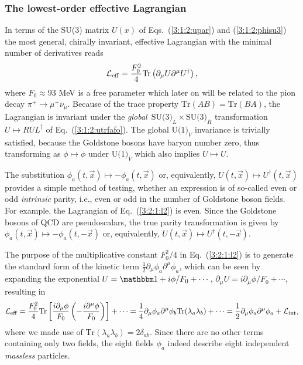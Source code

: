 \documentclass[twoside,12pt]{article}
\begin{document}
\subsubsection{The lowest-order effective Lagrangian}
\label{sec_loel}
   In terms of the SU(3) matrix $U(x)$ of Eqs.~(\ref{3:1:2:upar}) and
(\ref{3:1:2:phisu3}) the most general, chirally invariant, effective Lagrangian
with the minimal number of derivatives reads
\begin{equation}
\label{3:2:1:l2}
{\cal L}_{\rm eff}
=\frac{F^2_0}{4}\mbox{Tr}\left(\partial_\mu U \partial^\mu U^\dagger
\right),
\end{equation}
   where $F_0\approx 93$ MeV is a free parameter which later on will be
related to the pion decay $\pi^+\to\mu^+\nu_\mu$.
   Because of the trace property $\mbox{Tr}(AB)=\mbox{Tr}(BA)$,
the Lagrangian is invariant under the {\em global}\,
$\mbox{SU(3)}_L\times\mbox{SU(3)}_R$ transformation $U \mapsto R U L^\dagger$
of Eq.~(\ref{3:1:2:utrfafo}).
   The global $\mbox{U(1)}_V$ invariance is trivially satisfied, because
the Goldstone bosons have baryon number zero, thus transforming
as $\phi\mapsto\phi$ under $\mbox{U(1)}_V$ which also implies $U \mapsto U$.

   The substitution $\phi_a(t,\vec{x})\mapsto -\phi_a(t,\vec{x})$ or,
equivalently, $U(t,\vec{x})\mapsto U^\dagger(t,\vec{x})$ provides a simple
method of testing, whether an expression is of so-called even or odd
{\em intrinsic} parity,
i.e., even or odd in the number of Goldstone boson fields.
   For example, the Lagrangian of Eq.\ (\ref{3:2:1:l2}) is even.
   Since the Goldstone bosons of QCD are pseudoscalars, the true parity transformation
is given by $\phi_a(t,\vec{x})\mapsto -\phi_a(t,-\vec{x})$ or,
equivalently, $U(t,\vec{x})\mapsto U^\dagger(t,-\vec{x})$.

   The purpose of the multiplicative constant $F^2_0/4$ in Eq.\ (\ref{3:2:1:l2})
is to generate the standard form of the kinetic term
$\frac{1}{2}\partial_\mu \phi_a\partial^\mu \phi_a$, which can be seen by
expanding the exponential
$U={\mathbbm 1}+i\phi/F_0+\cdots$, $\partial_\mu U=i\partial_\mu\phi/F_0
+\cdots$, resulting in
\begin{displaymath}
{\cal L}_{\rm eff}=
\frac{F^2_0}{4}\mbox{Tr}\left[\frac{i\partial_\mu\phi}{F_0}
\left(-\frac{i\partial^\mu\phi}{F_0}\right)\right]+\cdots
=\frac{1}{4}\partial_\mu\phi_a\partial^\mu
\phi_b\mbox{Tr}(\lambda_a\lambda_b)+\cdots
=\frac{1}{2}\partial_\mu\phi_a\partial^\mu\phi_a +{\cal L}_{\rm int},
\end{displaymath}
where we made use of $\mbox{Tr}(\lambda_a \lambda_b)=2\delta_{ab}$.
   Since there are no other terms containing only two fields,
the eight fields $\phi_a$ indeed describe eight independent {\em massless}
particles.
\end{document}

